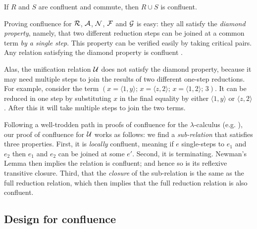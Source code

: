 \documentclass[acmsmall,review,anonymous,dvipsnames]{acmart}
\newcommand{\Varid}[1]{\mathit{#1}}
\newcommand{\simon}[1]{{\color{dkblue} [{SLPJ}: #1]}}
\newcommand{\simon}[1]{}
\begin{document}
\begin{lemma}[Commutativity] \label{lem:comm}
If $R$ and $S$ are confluent and commute, then $R \cup S$ is confluent.
\end{lemma}
\noindent
Proving confluence for $\mathcal{R}$, $\mathcal{A}$, $\mathcal{N}$, $\mathcal{F}$ and $\mathcal{G}$ is easy: they
all satisfy the \emph{diamond property}, namely, that two
different reduction steps can be joined at a common
term \emph{by a single step}.  This property can be verified easily by taking critical pairs.
Any relation satisfying the diamond property is confluent \cite{Barendregt}.

Alas, the unification relation $\mathcal{U}$ does not satisfy the diamond property, because
it may need multiple steps to join the results of two different
one-step reductions.
For example, consider the term $\ensuremath{(\Varid{x}=\langle\mathrm{1},\Varid{y}\rangle;\,\Varid{x}=\langle\Varid{z},\mathrm{2}\rangle;\,\Varid{x}=\langle\mathrm{1},\mathrm{2}\rangle;\,\mathrm{3})}$.
It can be reduced in one step by substituting \ensuremath{\Varid{x}} in the final equality
by either \ensuremath{\langle\mathrm{1},\Varid{y}\rangle} or \ensuremath{\langle\Varid{z},\mathrm{2}\rangle}.
After this it will take multiple steps to join the two terms.

Following a well-trodden path in proofs of confluence for the $\lambda$-calculus (e.g. \cite{Barendregt}),
our proof of confluence for $\mathcal{U}$ works as follows: we find
a \emph{sub-relation} that satisfies three properties.
%
First, it is \emph{locally} confluent, meaning if $e$ single-steps to $e_1$
and $e_2$ then $e_1$ and $e_2$ can be joined at some $e'$.
%
Second, it is terminating. Newman's Lemma \cite{Barendregt} then implies
the relation is confluent; and hence so is its reflexive transitive closure.
%
Third, that the \emph{closure} of the sub-relation is the same as the full reduction
relation, which then implies that the full reduction relation is also confluent.


\subsection{Design for confluence} \label{sec:design-confluence} \label{sec:even-odd}  \label{sec:unifying-lambda}
\end{document}
